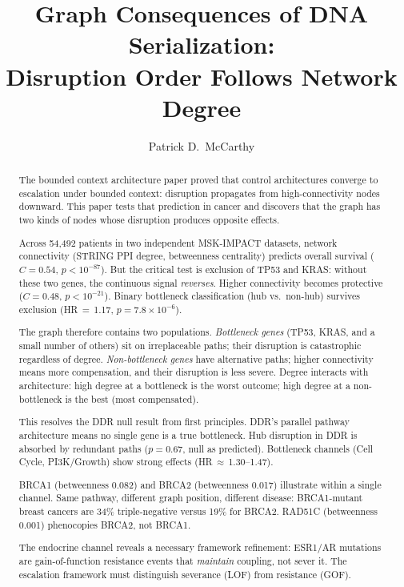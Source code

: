 \documentclass[11pt]{article}
\title{Graph Consequences of DNA Serialization:\\
Disruption Order Follows Network Degree}
\author{Patrick D.\ McCarthy}
\date{}
\begin{document}
\maketitle

\begin{abstract}
The bounded context architecture paper proved that control architectures converge
to escalation under bounded context: disruption propagates from
high-connectivity nodes downward. This paper tests that prediction
in cancer and discovers that the graph has two kinds of nodes whose
disruption produces opposite effects.

Across 54{,}492 patients in two independent MSK-IMPACT datasets,
network connectivity (STRING PPI degree, betweenness centrality)
predicts overall survival ($C = 0.54$, $p < 10^{-87}$). But
the critical test is exclusion of TP53 and KRAS: without these
two genes, the continuous signal \emph{reverses}. Higher
connectivity becomes protective ($C = 0.48$, $p < 10^{-21}$).
Binary bottleneck classification (hub vs.\ non-hub) survives
exclusion (HR\,$=$\,1.17, $p = 7.8 \times 10^{-6}$).

The graph therefore contains two populations. \emph{Bottleneck
genes} (TP53, KRAS, and a small number of others) sit on
irreplaceable paths; their disruption is catastrophic regardless
of degree. \emph{Non-bottleneck genes} have alternative paths;
higher connectivity means more compensation, and their disruption
is less severe. Degree interacts with architecture: high degree at
a bottleneck is the worst outcome; high degree at a non-bottleneck
is the best (most compensated).

This resolves the DDR null result from first principles. DDR's
parallel pathway architecture means no single gene is a true
bottleneck. Hub disruption in DDR is absorbed by redundant paths
($p = 0.67$, null as predicted). Bottleneck channels (Cell Cycle,
PI3K/Growth) show strong effects (HR\,$\approx$\,1.30--1.47).

BRCA1 (betweenness 0.082) and BRCA2 (betweenness 0.017)
illustrate within a single channel. Same pathway, different
graph position, different disease: BRCA1-mutant breast cancers
are 34\% triple-negative versus 19\% for BRCA2. RAD51C
(betweenness 0.001) phenocopies BRCA2, not BRCA1.

The endocrine channel reveals a necessary framework refinement:
ESR1/AR mutations are gain-of-function resistance events that
\emph{maintain} coupling, not sever it. The escalation framework
must distinguish severance (LOF) from resistance (GOF).
\end{abstract}
\end{document}
